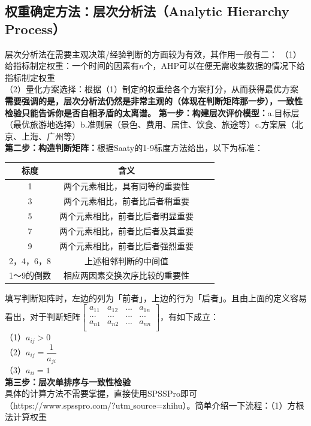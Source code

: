 \documentclass[11pt,a4paper]{article}
\begin{document}
\subsection{权重确定方法：层次分析法（Analytic Hierarchy Process）}
层次分析法在需要主观决策/经验判断的方面较为有效，其作用一般有二：
（1）给指标制定权重：一个时间的因素有$n$个，AHP可以在便无需收集数据的情况下给指标制定权重\\
（2）量化方案选择：根据（1）制定的权重给各个方案打分，从而获得最优方案\\
\indent\setlength{\parindent}{2em}\textbf{需要强调的是，层次分析法仍然是非常主观的（体现在判断矩阵那一步），一致性检验只能告诉你是否自相矛盾的太离谱。}
\textbf{第一步：\textbf{构建层次评价模型：}}a.目标层（最优旅游地选择）b.准则层（景色、费用、居住、饮食、旅途等）c.方案层（北京、上海、广州等）\\
\textbf{第二步：\textbf{构造判断矩阵：}}根据Saaty的1-9标度方法给出，以下为标准：
\begin{table}[h]
	\centering
	\begin{tabular}{cccc}
		\hline
		标度& 含义 \\
		\hline
		1& 两个元素相比，具有同等的重要性\\
		3& 两个元素相比，前者比后者稍重要\\
		5& 两个元素相比，前者比后者明显重要\\
		7& 两个元素相比，前者比后者及其重要\\
		9& 两个元素相比，前者比后者强烈重要\\
		2，4，6，8&上述相邻判断的中间值\\
		1～9的倒数&相应两因素交换次序比较的重要性\\
		\hline
	\end{tabular}
\end{table}
填写判断矩阵时，左边的列为「前者」，上边的行为「后者」。且由上面的定义容易看出，对于判断矩阵$\begin{bmatrix}
a_{11}&a_{12}&...&a_{1n}\\
...&...&...&...\\
a_{n1}&a_{n2}&...&a_{nn}\\
\end{bmatrix}$，有如下成立：\\
（1）$a_{ij}>0$\\
（2）$a_{ij}=\dfrac{1}{a_{ji}}$\\
（3）$a_{ii}=1$\\
\textbf{第三步：\textbf{层次单排序与一致性检验}}\\
\indent\setlength{\parindent}{2em}具体的计算方法不需要掌握，直接使用SPSSPro即可（https://www.spsspro.com/?utm$\_$source=zhihu）。简单介绍一下流程：（1）方根法计算权重\\
\end{document}
